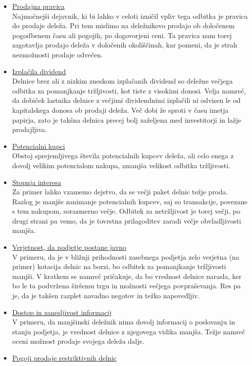 \documentclass[12pt,a4paper]{amsart}
\theoremstyle{definition} %
\theoremstyle{plain} %
\begin{document}
\begin{itemize}
\item\underline{Prodajna pravica}\\
Najmočnejši dejavnik, ki bi lahko v celoti izničil vpliv tega odbitka je pravica do prodaje deleža. Pri tem mislimo na deležnikovo prodajo ob določenem pogodbenem času ali pogojih, po dogovorjeni ceni. Ta pravica nam torej zagotavlja prodajo deleža v določenih okoliščinah, kar pomeni, da je strah nezmožnosti prodaje odvečen. 
\item\underline{Izplačila dividend}\\
Delnice brez ali z nizkim zneskom izplačanih dividend so deležne večjega odbitka za pomanjkanje tržljivosti, kot tiste z visokimi donosi. Velja namreč, da dobiček lastnika delnice z večjimi dividendnimi izplačili ni odvisen le od kapitalskega donosa ob prodaji deleža. Več dobi že sproti v času imetja papirja, zato je takšna delnica precej bolj zaželjena med investitorji in lažje prodajljiva. 
\item\underline{Potencialni kupci}\\
Obstoj sprejemljivega števila potencialnih kupcev deleža, ali celo enega z dovolj velikim potencialom nakupa, zmanjša velikost odbitka tržljivosti. 
\item\underline{Stopnja interesa}\\
Za primer lahko vzamemo dejstvo, da se večji paket delnic težje proda. Razlog je manjše zanimanje potencialnih kupcev, saj so transakcije, povezane s tem nakupom, sorazmerno večje. Odbitek za netržljivost je torej večji, po drugi strani pa vemo, da je tovrstna prilagoditev zaradi večje obvladljivosti manjša. 
\item\underline{Verjetnost, da podjetje postane javno}\\
V primeru, da je v bližnji prihodnosti zasebnega podjetja zelo verjetna (na primer) kotacija delnic na borzi, bo odbitek za pomanjkanje tržljivosti manjši. V kratkem se namreč pričakuje, da bo vrednost delnice narasla, ker bo le ta podvržena širšemu trgu in možnosti večjega povpraševanja. Res pa je, da je takšen razplet navadno negotov in težko napovedljiv.
\item\underline{Dostop in zanesljivost informacij}\\
V primeru, da manjšinski deležnik nima dovolj informacij o poslovanju in stanju podjetja, je vrednost delnice z njegovega vidika manjša. Težje namreč oceni možnost prodaje svojega deleža dalje.
\item\underline{Pogoji prodaje restriktivnih delnic}\\

\end{itemize}
\end{document}

